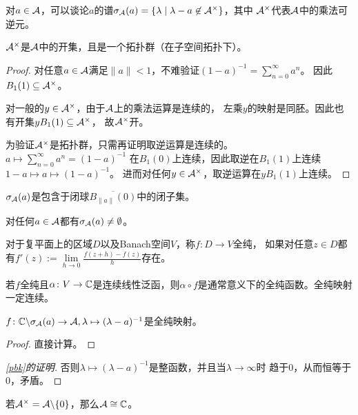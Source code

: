 对$a \in \mathcal{A}$，可以谈论$a$的谱$\sigma_{\mathcal{A}}(a) = \{\lambda \mid \lambda-a \not\in \mathcal{A}^\times\}$，其中
$\mathcal{A}^\times$代表$\mathcal{A}$中的乘法可逆元。
\begin{lemma}
    $\mathcal{A}^\times$是$\mathcal{A}$中的开集，且是一个拓扑群（在子空间拓扑下）。
\end{lemma}
\begin{proof}
  对任意$a \in \mathcal{A}$满足$\|a\| < 1$，不难验证$(1-a)^{-1} = \sum\limits_{n=0}^\infty a^n$。
  因此$B_1(1) \subseteq \mathcal{A}^\times$。
  
  对一般的$y \in \mathcal{A}^\times$，由于$\mathcal{A}$上的乘法运算是连续的，
  左乘$y$的映射是同胚。因此也有开集$yB_1(1) \subseteq \mathcal{A}^\times$，
  故$\mathcal{A}^\times$开。

  为验证$\mathcal{A}^\times$是拓扑群，只需再证明取逆运算是连续的。$a \mapsto \sum\limits_{n=0}^\infty a^n = (1-a)^{-1}$
  在$B_1(0)$上连续，因此取逆在$B_1(1)$上连续$1-a \mapsto a \mapsto (1-a)^{-1}$。
  进而对任何$y \in \mathcal{A}^\times$，取逆运算在$yB_1(1)$上连续。
\end{proof}
\begin{lemma}
    $\sigma_{\mathcal{A}}(a)$是包含于闭球$\overline{B_{\|a\|}(0)}$中的闭子集。
\end{lemma}
\begin{lemma}\label{pbk}
    对任何$a \in \mathcal{A}$都有$\sigma_{\mathcal{A}}(a) \neq \emptyset$。
\end{lemma}
\begin{definition}
    对于复平面上的区域$D$以及Banach空间$V$，称$f\colon D \to V$全纯，
    如果对任意$z \in D$都有$\displaystyle f'(z):= \lim\limits_{h \to 0}\frac{f(z+h)-f(z)}{h}$存在。
\end{definition}
\begin{remark}
    若$f$全纯且$\alpha \colon V \to \mathbb{C}$是连续线性泛函，则$\alpha \circ f$是通常意义下的全纯函数。全纯映射一定连续。
\end{remark}
\begin{lemma}
    $f \colon \mathbb{C}\backslash \sigma_{\mathcal{A}}(a) \to \mathcal{A}, \lambda \mapsto (\lambda-a)^{-1}$是全纯映射。
\end{lemma}
\begin{proof}
    直接计算。
\end{proof}
\begin{proof}[\ref{pbk}的证明]
否则$\lambda \mapsto (\lambda - a)^{-1}$是整函数，并且当$\lambda \to \infty$时
趋于$0$，从而恒等于$0$，矛盾。
\end{proof}
\begin{corollary}
    若$\mathcal{A}^\times = \mathcal{A}\backslash\{0\}$，那么$\mathcal{A} \cong \mathbb{C}$。
\end{corollary}
